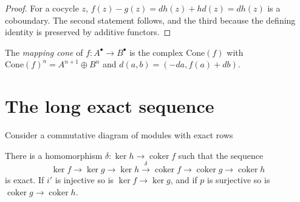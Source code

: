 \begin{proof}
For a cocycle $z$, $f(z) - g(z) = dh(z) + hd(z) = dh(z)$ is a coboundary. The second statement follows, and the third
because the defining identity is preserved by additive functors.
\end{proof}

\begin{definition}\label{homological-algebra:definition-cone}
The \emph{mapping cone} of $f \colon A^\bullet \to B^\bullet$ is the complex $\mathrm{Cone}(f)$ with
$\mathrm{Cone}(f)^n = A^{n+1} \oplus B^n$ and $d(a, b) = (-da, f(a) + db)$.
\end{definition}

\section{The long exact sequence}\label{homological-algebra:section-long-exact}

\begin{lemma}\label{homological-algebra:lemma-snake}
Consider a commutative diagram of modules with exact rows
\begin{center}
\end{center}
There is a homomorphism $\delta \colon \ker h \to \operatorname{coker} f$ such that the sequence
\[
\ker f \to \ker g \to \ker h \xrightarrow{\delta} \operatorname{coker} f \to \operatorname{coker} g \to \operatorname{coker} h
\]
is exact. If $i'$ is injective so is $\ker f \to \ker g$, and if $p$ is surjective so is $\operatorname{coker} g \to \operatorname{coker} h$.
\end{lemma}

